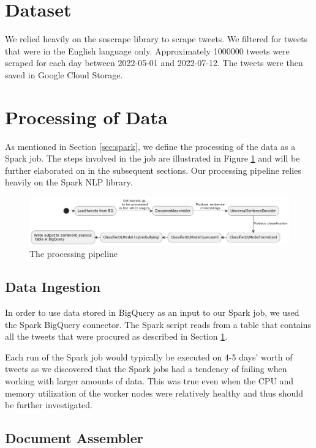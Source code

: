 \documentclass[a4paper,12pt]{article}
\begin{document}
\section{Dataset}
\label{sec:dataset}
We relied heavily on the snscrape \cite{snscrape} library to scrape tweets. We filtered for tweets that were in the
English language only. Approximately 1000000 tweets were scraped for each day between 2022-05-01 and 2022-07-12. The
tweets were then saved in Google Cloud Storage.

\section{Processing of Data}

As mentioned in Section \ref{sec:spark}, we define the processing of the data as a Spark job. The steps involved in the
job are illustrated in Figure \ref{fig:data-processing-pipeline} and will be further elaborated on in the subsequent
sections. Our processing pipeline relies heavily on the Spark NLP library\cite{SparkNLP}.

\begin{figure}[h]
\centering
\includegraphics[width=\textwidth]{data-processing.png}
\caption{The processing pipeline}
\label{fig:data-processing-pipeline}
\end{figure}

\subsection{Data Ingestion}

In order to use data stored in BigQuery as an input to our Spark job, we used the Spark BigQuery
connector\cite{BigQueryconnector}. The Spark script reads from a table that contains all the tweets that were
procured as described in Section \ref{sec:dataset}.

Each run of the Spark job would typically be executed on 4-5 days' worth of tweets as we discovered that the Spark jobs
had a tendency of failing when working with larger amounts of data. This was true even when the CPU and memory
utilization of the worker nodes were relatively healthy and thus should be further investigated.

\subsection{Document Assembler}
\end{document}
